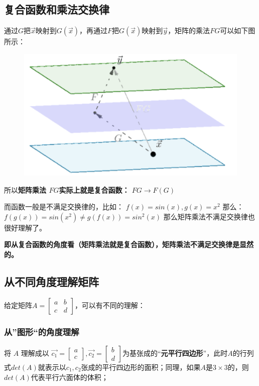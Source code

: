 \documentclass[12pt]{article}
\begin{document}
\subsection{复合函数和乘法交换律}
通过$G$把$\vec{x}$映射到$G(\vec{x})$，再通过$F$把$G(\vec{x})$映射到$\vec{y}$，矩阵的乘法$FG$可以如下图所示：
\begin{figure}[H]
\centering
\includegraphics[width=.3\textwidth]{fig/UnderstandMatrixMultiplication_9.png}
\end{figure}

所以\textbf{矩阵乘法 $FG$实际上就是复合函数：
$FG \rightarrow F(G)$}

而函数一般是不满足交换律的，比如：
$f(x)=sin(x), g(x)=x^2$
那么：
$f(g(x))=sin(x^2)\ne g(f(x))=sin^2(x)$
那么矩阵乘法不满足交换律也很好理解了。

\textbf{即从复合函数的角度看（矩阵乘法就是复合函数），矩阵乘法不满足交换律是显然的。}

\subsection{从不同角度理解矩阵}
给定矩阵$A = \begin{bmatrix}
    a & b\\ c & d
\end{bmatrix}$，可以有不同的理解：
\subsubsection{从”图形“的角度理解}
将 $A$ 理解成以 $\vec{c_1} = \begin{bmatrix}a\\c\end{bmatrix},\vec{c_2} = \begin{bmatrix}b\\d\end{bmatrix}$为基张成的“\textbf{元平行四边形}”，此时$A$的行列式$det(A)$就表示以$c_1,c_2$张成的平行四边形的面积；同理，如果$A$是$3\times3$的，则$det(A)$代表平行六面体的体积；
\end{document}

